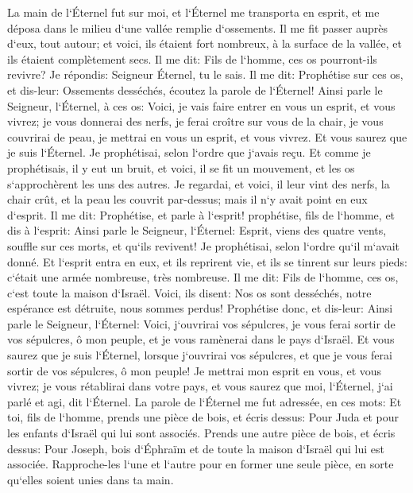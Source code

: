 \verse La main de l`Éternel fut sur moi, et l`Éternel me transporta en esprit, et me déposa dans le milieu d`une vallée remplie d`ossements. 
\verse Il me fit passer auprès d`eux, tout autour; et voici, ils étaient fort nombreux, à la surface de la vallée, et ils étaient complètement secs. 
\verse Il me dit: Fils de l`homme, ces os pourront-ils revivre? Je répondis: Seigneur Éternel, tu le sais. 
\verse Il me dit: Prophétise sur ces os, et dis-leur: Ossements desséchés, écoutez la parole de l`Éternel! 
\verse Ainsi parle le Seigneur, l`Éternel, à ces os: Voici, je vais faire entrer en vous un esprit, et vous vivrez; 
\verse je vous donnerai des nerfs, je ferai croître sur vous de la chair, je vous couvrirai de peau, je mettrai en vous un esprit, et vous vivrez. Et vous saurez que je suis l`Éternel. 
\verse Je prophétisai, selon l`ordre que j`avais reçu. Et comme je prophétisais, il y eut un bruit, et voici, il se fit un mouvement, et les os s`approchèrent les uns des autres. 
\verse Je regardai, et voici, il leur vint des nerfs, la chair crût, et la peau les couvrit par-dessus; mais il n`y avait point en eux d`esprit. 
\verse Il me dit: Prophétise, et parle à l`esprit! prophétise, fils de l`homme, et dis à l`esprit: Ainsi parle le Seigneur, l`Éternel: Esprit, viens des quatre vents, souffle sur ces morts, et qu`ils revivent! 
\verse Je prophétisai, selon l`ordre qu`il m`avait donné. Et l`esprit entra en eux, et ils reprirent vie, et ils se tinrent sur leurs pieds: c`était une armée nombreuse, très nombreuse. 
\verse Il me dit: Fils de l`homme, ces os, c`est toute la maison d`Israël. Voici, ils disent: Nos os sont desséchés, notre espérance est détruite, nous sommes perdus! 
\verse Prophétise donc, et dis-leur: Ainsi parle le Seigneur, l`Éternel: Voici, j`ouvrirai vos sépulcres, je vous ferai sortir de vos sépulcres, ô mon peuple, et je vous ramènerai dans le pays d`Israël. 
\verse Et vous saurez que je suis l`Éternel, lorsque j`ouvrirai vos sépulcres, et que je vous ferai sortir de vos sépulcres, ô mon peuple! 
\verse Je mettrai mon esprit en vous, et vous vivrez; je vous rétablirai dans votre pays, et vous saurez que moi, l`Éternel, j`ai parlé et agi, dit l`Éternel. 
\verse La parole de l`Éternel me fut adressée, en ces mots: 
\verse Et toi, fils de l`homme, prends une pièce de bois, et écris dessus: Pour Juda et pour les enfants d`Israël qui lui sont associés. Prends une autre pièce de bois, et écris dessus: Pour Joseph, bois d`Éphraïm et de toute la maison d`Israël qui lui est associée. 
\verse Rapproche-les l`une et l`autre pour en former une seule pièce, en sorte qu`elles soient unies dans ta main. 
